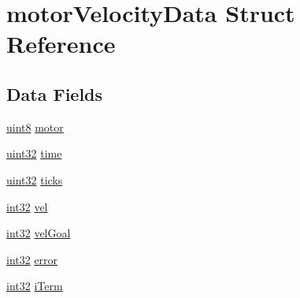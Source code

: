 \hypertarget{structmotor_velocity_data}{
\section{motorVelocityData Struct Reference}
\label{structmotor_velocity_data}
}
\subsection*{Data Fields}
\begin{DoxyCompactItemize}
\item 
\hyperlink{typedefs_8h_adde6aaee8457bee49c2a92621fe22b79}{uint8} \hyperlink{structmotor_velocity_data_a5180d07c28823b4c4fe102de5d4156c5}{motor}
\item 
\hyperlink{typedefs_8h_a4b435a49c74bb91f284f075e63416cb6}{uint32} \hyperlink{structmotor_velocity_data_a37ae264555f7fddbd5bf4717114bfcd0}{time}
\item 
\hyperlink{typedefs_8h_a4b435a49c74bb91f284f075e63416cb6}{uint32} \hyperlink{structmotor_velocity_data_a693598e4a6b3dc9b044f5d905746a461}{ticks}
\item 
\hyperlink{typedefs_8h_a4ca2d97e571b049be6f4cdcfaa1ab946}{int32} \hyperlink{structmotor_velocity_data_ad9d4f17a6cc076215d4a6f7df49e3e0f}{vel}
\item 
\hyperlink{typedefs_8h_a4ca2d97e571b049be6f4cdcfaa1ab946}{int32} \hyperlink{structmotor_velocity_data_a4e5f814db8101365b6d3f53f147dc7b0}{velGoal}
\item 
\hyperlink{typedefs_8h_a4ca2d97e571b049be6f4cdcfaa1ab946}{int32} \hyperlink{structmotor_velocity_data_a3f001dd176d9ebcf61942c27dd6f7f0f}{error}
\item 
\hyperlink{typedefs_8h_a4ca2d97e571b049be6f4cdcfaa1ab946}{int32} \hyperlink{structmotor_velocity_data_a9fa60129570d0c08c5973052663f2d11}{iTerm}
\end{DoxyCompactItemize}


